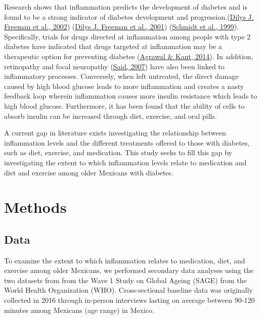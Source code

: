 \documentclass[
  man]{apa6}
\begin{document}
Research shows that inflammation predicts the development of diabetes and is found to be a strong indicator of diabetes development and progression.(\protect\hyperlink{ref-freemanCreactiveProteinIndependent2002}{Dilys J. Freeman et al., 2002}) (\protect\hyperlink{ref-10.1161ux2f01.cir.103.3.357}{Dilys J. Freeman et al., 2001}) (\protect\hyperlink{ref-schmidtMarkersInflammationPrediction1999}{Schmidt et al., 1999}). Specifically, trials for drugs directed at inflammation among people with type 2 diabetes have indicated that drugs targeted at inflammation may be a therapeutic option for preventing diabetes (\protect\hyperlink{ref-10.4239ux2fwjd.v5.i5.697}{Agrawal \& Kant, 2014}). In addition, retinopathy and focal neuropathy (\protect\hyperlink{ref-saidDiabeticNeuropathyReview2007}{Said, 2007}) have also been linked to inflammatory processes. Conversely, when left untreated, the direct damage caused by high blood glucose leads to more inflammation and creates a nasty feedback loop wherein inflammation causes more insulin resistance which leads to high blood glucose. Furthermore, it has been found that the ability of cells to absorb insulin can be increased through diet, exercise, and oral pills.

A current gap in literature exists investigating the relationship between inflammation levels and the different treatments offered to those with diabetes, such as diet, exercise, and medication. This study seeks to fill this gap by investigating the extent to which inflammation levels relate to medication and diet and exercise among older Mexicans with diabetes.

\hypertarget{methods}{%
\section{Methods}\label{methods}}

\hypertarget{data}{%
\subsection{Data}\label{data}}

To examine the extent to which inflammation relates to medication, diet, and exercise among older Mexicans, we performed secondary data analyses using the two datasets from from the Wave 1 Study on Global Ageing (SAGE) from the World Health Organization (WHO). Cross-sectional baseline data was originally collected in 2016 through in-person interviews lasting on average between 90-120 minutes among Mexicans (age range) in Mexico.
\end{document}
